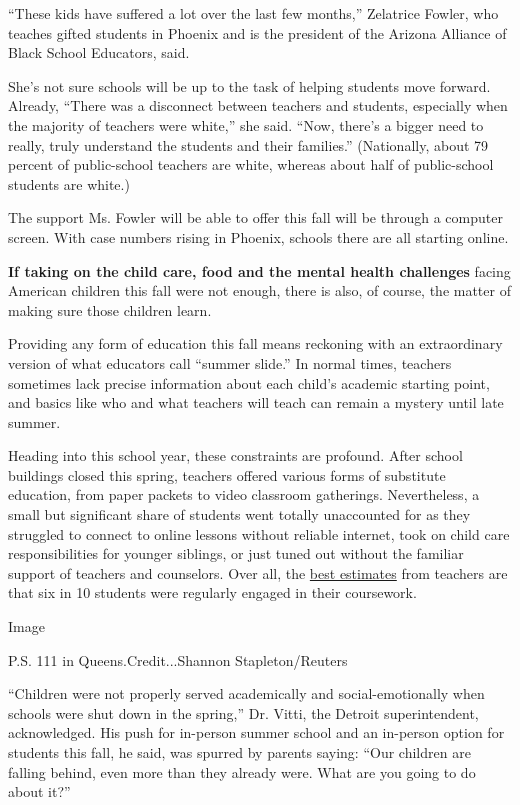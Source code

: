 ``These kids have suffered a lot over the last few months,'' Zelatrice
Fowler, who teaches gifted students in Phoenix and is the president of
the Arizona Alliance of Black School Educators, said.

She's not sure schools will be up to the task of helping students move
forward. Already, ``There was a disconnect between teachers and
students, especially when the majority of teachers were white,'' she
said. ``Now, there's a bigger need to really, truly understand the
students and their families.'' (Nationally, about 79 percent of
public-school teachers are white, whereas about half of public-school
students are white.)

The support Ms. Fowler will be able to offer this fall will be through a
computer screen. With case numbers rising in Phoenix, schools there are
all starting online.

\textbf{If taking on the child care, food and the mental health
challenges} facing American children this fall were not enough, there is
also, of course, the matter of making sure those children learn.

Providing any form of education this fall means reckoning with an
extraordinary version of what educators call ``summer slide.'' In normal
times, teachers sometimes lack precise information about each child's
academic starting point, and basics like who and what teachers will
teach can remain a mystery until late summer.

Heading into this school year, these constraints are profound. After
school buildings closed this spring, teachers offered various forms of
substitute education, from paper packets to video classroom gatherings.
Nevertheless, a small but significant share of students went totally
unaccounted for as they struggled to connect to online lessons without
reliable internet, took on child care responsibilities for younger
siblings, or just tuned out without the familiar support of teachers and
counselors. Over all, the
\href{https://www.chalkbeat.org/2020/6/26/21304405/surveys-remote-learning-coronavirus-success-failure-teachers-parents}{best
estimates} from teachers are that six in 10 students were regularly
engaged in their coursework.

Image

P.S. 111 in Queens.Credit...Shannon Stapleton/Reuters

``Children were not properly served academically and social-emotionally
when schools were shut down in the spring,'' Dr. Vitti, the Detroit
superintendent, acknowledged. His push for in-person summer school and
an in-person option for students this fall, he said, was spurred by
parents saying: ``Our children are falling behind, even more than they
already were. What are you going to do about it?''


